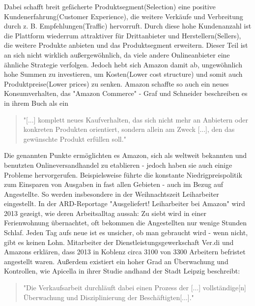 Dabei schafft breit gefächerte Produktsegment(Selection) eine positive Kundenerfahrung(Customer Experience), die weitere Verkäufe und Verbreitung durch z. B. Empfehlungen(Traffic) hervorruft. Durch diese hohe Kundenanzahl ist die Plattform wiederrum attraktiver für Drittanbieter und Herstellern(Sellers), die weitere Produkte anbieten und das Produktsegment erweitern. Dieser Teil ist an sich nicht wirklich außergewöhnlich, da viele andere Onlineanbieter eine ähnliche Strategie verfolgen. Jedoch hebt sich Amazon damit ab, ungewöhnlich hohe Summen zu investieren, um Kosten(Lower cost structure) und somit auch Produktpreise(Lower prices) zu senken\cite[S. 26f]{Graf}. Amazon schaffte so auch ein neues Konsumverhalten, das "Amazon Commerce" - Graf und Schneider beschreiben es in ihrem Buch als ein

\begin{quote}
    "[...] komplett neues Kaufverhalten, das sich nicht mehr an Anbietern oder konkreten Produkten orientiert, sondern allein am Zweck [...], den das gewünschte Produkt erfüllen soll."\cite[S. 42]{Graf}
\end{quote}

Die genannten Punkte ermöglichten es Amazon, sich als weltweit bekannten und benutzten Onlineversandhandel zu etablieren - jedoch haben sie auch einige Probleme hervorgerufen. Beispielsweise führte die konstante Niedrigpreispolitik\cite[Abb. 5]{Desjardins} zum Einsparen von Ausgaben in fast allen Gebieten - auch im Bezug auf Angestellte\cite[S. 6]{Apicella}. So werden insbesondere in der Weihnachtszeit Leiharbeiter eingestellt. In der ARD-Reportage "Ausgeliefert! Leiharbeiter bei Amazon" wird 2013 gezeigt, wie deren Arbeitsalltag aussah: Zu siebt wird in einer Ferienwohnung übernachtet, oft bekommen die Angestellten nur wenige Stunden Schlaf. Jeden Tag aufs neue ist es unsicher, ob man gebraucht wird - wenn nicht, gibt es keinen Lohn. Mitarbeiter der Dienstleistungsgewerkschaft Ver.di und Amazons erklären, dass 2013 in Koblenz circa 3100 von 3300 Arbeitern befristet angestellt waren\cite{Ausgeliefert}.
Außerdem existiert ein hoher Grad an Überwachung und Kontrollen, wie Apicella in ihrer Studie andhand der Stadt Leipzig beschreibt:

\begin{quote}
    "Die Verkaufsarbeit durchläuft dabei einen Prozess der [...] vollständige[n] Überwachung und Disziplinierung der Beschäftigten[...].\cite[S. 29]{Apicella}"
\end{quote}

